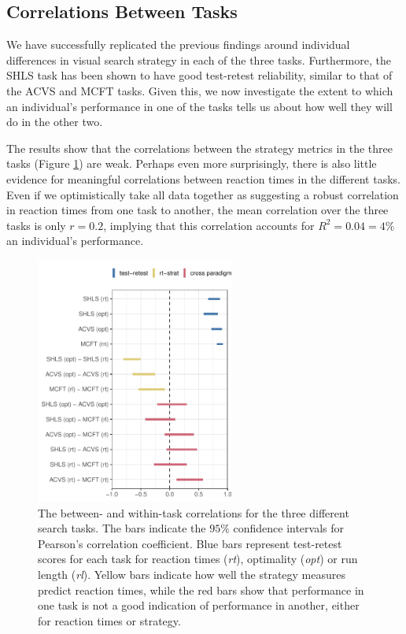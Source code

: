\documentclass[twocolumn]{article}
\begin{document}
\subsection{Correlations Between Tasks}

We have successfully replicated the previous findings around individual differences in visual search strategy in each of the three tasks. Furthermore, the SHLS task has been shown to have good test-retest reliability, similar to that of the ACVS  and MCFT tasks. Given this, we now investigate the extent to which an individual's performance in one of the tasks tells us about how well they will do in the other two. 

The results show that the correlations between the strategy metrics in the three tasks (Figure \ref{fig:all_the_cor}) are weak. Perhaps even more surprisingly, there is also little evidence for meaningful correlations between reaction times in the different tasks. Even if we optimistically take all data together as suggesting a robust correlation in reaction times from one task to another, the mean correlation over the three tasks is only $r = 0.2$, implying that this correlation accounts for  $R^2 = 0.04 = 4\%$ an individual's performance. 

\begin{figure}
\centering
\includegraphics[width=6.5cm]{../Scripts/scratch/cor_comparison.pdf}
\caption{The between- and within-task correlations for the three different search tasks. The bars indicate the $95\%$ confidence intervals for Pearson's correlation coefficient. Blue bars represent test-retest scores for each task for reaction times (\textit{rt}), optimality (\textit{opt}) or run length (\textit{rl}). Yellow bars indicate how well the strategy measures predict reaction times, while the red bars show that performance in one task is not a good indication of performance in another, either for reaction times or strategy.}
\label{fig:all_the_cor}
\end{figure}
\end{document}
